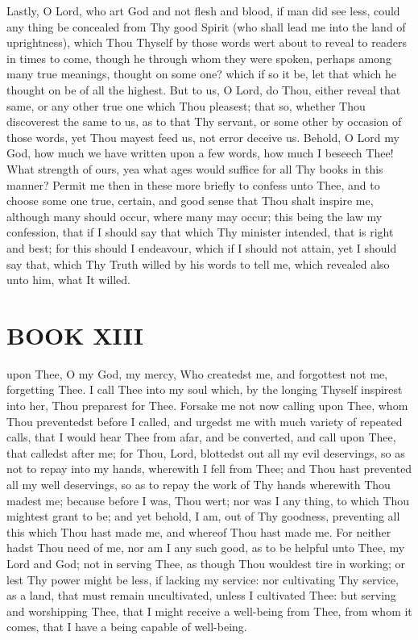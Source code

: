 \documentclass[b5paper,openright,12pt,twoside]{book}
\begin{document}
Lastly, O Lord, who art God and not flesh and blood, if man did see
less, could any thing be concealed from Thy good Spirit (who shall lead
me into the land of uprightness), which Thou Thyself by those words wert
about to reveal to readers in times to come, though he through whom
they were spoken, perhaps among many true meanings, thought on some one?
which if so it be, let that which he thought on be of all the highest.
But to us, O Lord, do Thou, either reveal that same, or any other true
one which Thou pleasest; that so, whether Thou discoverest the same to
us, as to that Thy servant, or some other by occasion of those words,
yet Thou mayest feed us, not error deceive us. Behold, O Lord my God,
how much we have written upon a few words, how much I beseech Thee! What
strength of ours, yea what ages would suffice for all Thy books in this
manner? Permit me then in these more briefly to confess unto Thee, and
to choose some one true, certain, and good sense that Thou shalt inspire
me, although many should occur, where many may occur; this being the law
my confession, that if I should say that which Thy minister intended,
that is right and best; for this should I endeavour, which if I should
not attain, yet I should say that, which Thy Truth willed by his words
to tell me, which revealed also unto him, what It willed.




\chapter{BOOK XIII}


 upon Thee, O my God, my mercy, Who createdst me, and forgottest
not me, forgetting Thee. I call Thee into my soul which, by the longing
Thyself inspirest into her, Thou preparest for Thee. Forsake me not now
calling upon Thee, whom Thou preventedst before I called, and urgedst me
with much variety of repeated calls, that I would hear Thee from afar,
and be converted, and call upon Thee, that calledst after me; for Thou,
Lord, blottedst out all my evil deservings, so as not to repay into my
hands, wherewith I fell from Thee; and Thou hast prevented all my well
deservings, so as to repay the work of Thy hands wherewith Thou madest
me; because before I was, Thou wert; nor was I any thing, to which
Thou mightest grant to be; and yet behold, I am, out of Thy goodness,
preventing all this which Thou hast made me, and whereof Thou hast made
me. For neither hadst Thou need of me, nor am I any such good, as to be
helpful unto Thee, my Lord and God; not in serving Thee, as though Thou
wouldest tire in working; or lest Thy power might be less, if lacking
my service: nor cultivating Thy service, as a land, that must remain
uncultivated, unless I cultivated Thee: but serving and worshipping
Thee, that I might receive a well-being from Thee, from whom it comes,
that I have a being capable of well-being.
\end{document}
